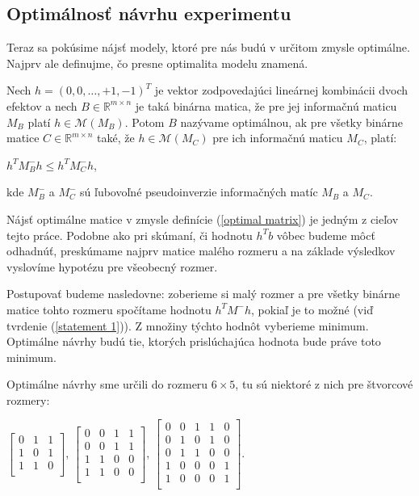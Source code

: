 \subsection{Optimálnosť návrhu experimentu}

Teraz sa pokúsime nájsť modely, ktoré pre nás budú v určitom zmysle optimálne. 
Najprv ale definujme, čo presne optimalita modelu znamená.

\begin{defin}
\label{optimal matrix definition}
Nech $h = (0, 0,\ldots , +1, -1)^T$ je vektor zodpovedajúci lineárnej kombinácii dvoch efektov
a nech $B \in \mathbb{R}^{m \times n}$ je taká binárna matica, že pre jej informačnú maticu $M_B$ platí $h \in \mathcal{M}(M_B)$.
Potom $B$ nazývame optimálnou, ak pre všetky binárne matice $C \in \mathbb{R}^{m \times n}$ také,
že $h \in \mathcal{M}(M_C)$ pre ich informačnú maticu $M_C$, platí:

\begin{center}
\label{optimal matrix}
$h^T M_{B}^- h \leq h^T M_{C}^- h$,
\end{center}
kde $M_{B}^-$ a $M_{C}^-$ sú ľubovoľné pseudoinverzie informačných matíc $M_B$ a $M_C$.

\end{defin}

Nájsť optimálne matice v zmysle definície (\ref{optimal matrix}) je jedným z cieľov tejto práce. 
Podobne ako pri skúmaní, či hodnotu $h^T b$ vôbec budeme môcť odhadnúť, 
preskúmame najprv matice malého rozmeru a na základe výsledkov vyslovíme hypotézu pre všeobecný rozmer.

Postupovať budeme nasledovne: zoberieme si malý rozmer a pre všetky binárne matice tohto rozmeru spočítame hodnotu $h^T M^- h$, 
pokiaľ je to možné (viď tvrdenie (\ref{statement 1})). Z množiny týchto hodnôt vyberieme minimum. 
Optimálne návrhy budú tie, ktorých prislúchajúca hodnota bude práve toto minimum.

Optimálne návrhy sme určili do rozmeru $6 \times 5$, tu sú niektoré z nich pre štvorcové rozmery:

\begin{center}
$
\begin{bmatrix}
0 & 1 & 1 \\ 
1 & 0 & 1 \\ 
1 & 1 & 0 \\ 
\end{bmatrix}
$, 
$
\begin{bmatrix}
0 & 0 & 1 & 1 \\
0 & 0 & 1 & 1 \\
1 & 1 & 0 & 0 \\
1 & 1 & 0 & 0 \\
\end{bmatrix}
$, 
$
\begin{bmatrix}
0 & 0 & 1 & 1 & 0 \\
0 & 1 & 0 & 1 & 0 \\
0 & 1 & 1 & 0 & 0 \\
1 & 0 & 0 & 0 & 1 \\
1 & 0 & 0 & 0 & 1 \\
\end{bmatrix}
$.
\end{center}

